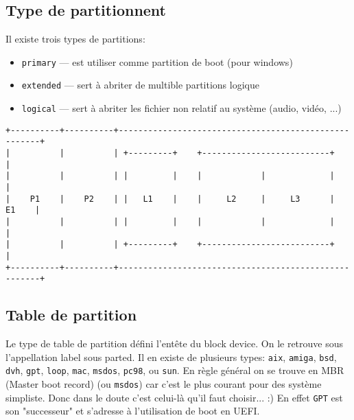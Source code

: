 \documentclass[compress]{beamer}
\begin{document}
\subsection{Type de partitionnent}
\begin{frame}[fragile]
Il existe trois types de partitions:
\begin{itemize}
	\item \texttt{primary} — est utiliser comme partition de boot (pour windows)
	\item \texttt{extended} — sert à abriter de multible partitions logique
	\item \texttt{logical} — sert à abriter les fichier non relatif au système (audio, vidéo, ...)
\end{itemize}

\begin{lstlisting}[basicstyle=\tiny\ttfamily\color{white}]
+----------+----------+------------------------------------------------------+
|          |          | +---------+    +--------------------------+          |
|          |          | |         |    |            |             |          |
|    P1    |    P2    | |   L1    |    |     L2     |     L3      |    E1    |
|          |          | |         |    |            |             |          |
|          |          | +---------+    +--------------------------+          |
+----------+----------+------------------------------------------------------+
\end{lstlisting}
\end{frame}

\subsection{Table de partition}

\begin{frame}[fragile]
Le type de table de partition défini l'entête du block device.\newline
On le retrouve sous l’appellation label sous parted.\newline
Il en existe de plusieurs types: \texttt{aix}, \texttt{amiga}, \texttt{bsd}, \texttt{dvh}, \texttt{gpt}, \texttt{loop}, \texttt{mac}, \texttt{msdos}, \texttt{pc98}, ou \texttt{sun}.\newline
\newline
En règle général on se trouve en MBR (Master boot record) (ou \texttt{msdos}) car c'est le plus courant pour des système simpliste.\newline
Donc dans le doute c'est celui-là qu'il faut choisir... :) \newline
En effet \texttt{GPT} est son "successeur" et s'adresse à l'utilisation de boot en UEFI.
\end{frame}
\end{document}
